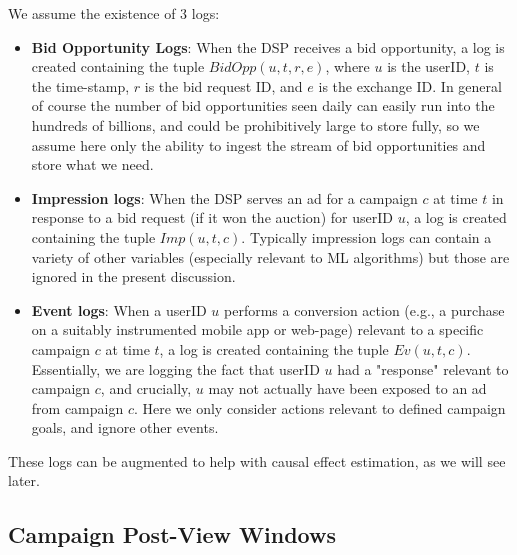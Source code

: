 \documentclass[11pt,a4paper]{article}
\theoremstyle{definition}
\theoremstyle{remark}
\theoremstyle{definition}
\theoremstyle{definition}
\theoremstyle{definition}
\theoremstyle{definition}
\theoremstyle{definition}
\theoremstyle{definition}
\begin{document}
We assume the existence of 3 logs:
\begin{itemize}
	\item {\bf Bid Opportunity Logs}: When the DSP receives a bid opportunity, a log is created containing the tuple $BidOpp(u, t, r, e)$, where $u$ is the userID, $t$ is the time-stamp, $r$ is the bid request ID, and $e$ is the exchange ID. In general of course the number of bid opportunities seen daily can easily run into the hundreds of billions, and could be prohibitively large to store fully, so we assume here only the ability to ingest the stream of bid opportunities and store what we need.
	\item {\bf Impression logs}: When the DSP serves an ad for a campaign $c$ at time $t$ in response to a bid request (if it won the auction) for userID $u$, a log is created containing the tuple $Imp(u,t,c)$. Typically impression logs can contain a variety of other variables (especially relevant to ML algorithms) but those are ignored in the present discussion.
	\item {\bf Event logs}: When a userID $u$ performs a conversion action (e.g., a purchase on a suitably instrumented mobile app or web-page) relevant to a specific campaign $c$ at time $t$, a log is created containing the tuple $Ev(u, t, c)$. Essentially, we are logging the fact that userID $u$ had a "response" relevant to campaign $c$, and crucially, $u$ may not actually have been exposed to an ad from campaign $c$. Here we only consider actions relevant to defined campaign goals, and ignore other events.
\end{itemize}

These logs can be augmented to help with causal effect estimation, as we will see later.


\subsection{Campaign Post-View Windows}\label{sec-pv}
\end{document}
